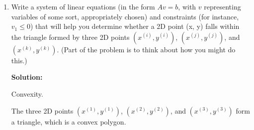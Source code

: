 \documentclass[conference,onecolumn]{IEEEtran}
\begin{document}
\begin{enumerate}[label=\arabic{enumi}.]
          \begin{enumerate}
              \item Write a system of linear equations (in the form $Av = b$, with $v$ representing variables of some sort, appropriately chosen) and constraints (for instance, $v_1 \leq 0$) that will help you determine whether a 2D point (x, y) falls within the triangle formed by three 2D points $(x^{(i)}, y^{(i)})$, $(x^{(j)}, y^{(j)})$, and $(x^{(k)}, y^{(k)})$.
                    (Part of the problem is to think about how you might do this.)

                    \textbf{Solution:}

                    Convexity.

                    The three 2D points $(x^{(1)}, y^{(1)})$, $(x^{(2)}, y^{(2)})$, and $(x^{(3)}, y^{(3)})$ form a triangle, which is a convex polygon.


\end{enumerate}
\end{enumerate}
\end{document}
